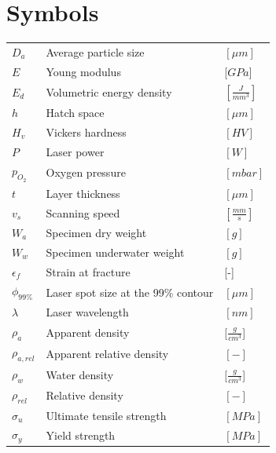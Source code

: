 \documentclass[
11pt, %
british, %
singlespacing, %
headsepline, %
]{MastersDoctoralThesis} %
\begin{document}
\chapter*{Symbols}%
\begin{tabular}{lll}

\centering

$D_a$ & Average particle size & $[\mu m]$\\ 
$E$ & Young modulus & [$GPa$]\\
$E_d$ & Volumetric energy density & $[\frac{J}{mm^3}]$\\
$h$ & Hatch space & $[\mu m]$\\
$H_v$ & Vickers hardness & $[HV]$\\
$P$ & Laser power & $[W]$ \\
$p_{O_2}$ & Oxygen pressure & $[mbar]$\\
$t$ & Layer thickness & $[\mu m]$\\
$v_s$ & Scanning speed & $[\frac{mm}{s}]$ \\
$W_a$ & Specimen dry weight& $ [g]$ \\
$W_w$ & Specimen underwater weight & $[g]$\\
\addlinespace
\addlinespace
$\epsilon_f$ & Strain at fracture & [-]\\
$\phi_{99\%}$ & Laser spot size at the 99\% contour & $[\mu m]$\\
$\lambda$ & Laser wavelength & $[nm]$\\
$\rho_{a}$ & Apparent density & $[\frac{g}{cm^3}$] \\
$\rho_{a,rel}$ & Apparent relative density & $[-]$ \\
$\rho_{w}$ & Water density & $[\frac{g}{cm^3}$]\\
$\rho_{rel}$ & Relative density & $[-]$ \\
$\sigma_u$ & Ultimate tensile strength & $[MPa]$\\
$\sigma_y$ & Yield strength & $[MPa]$\\


\end{tabular}

\end{document}
